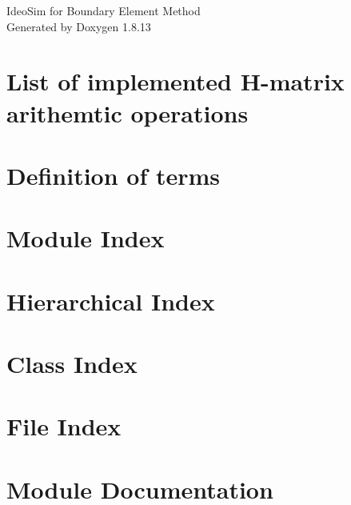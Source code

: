 \documentclass[twoside]{book}
\newcommand{\+}{\discretionary{\mbox{\scriptsize$\hookleftarrow$}}{}{}}
\newcommand{\clearemptydoublepage}{%
  \newpage{\pagestyle{empty}\cleardoublepage}%
}
\begin{document}
\hypersetup{pageanchor=false,
             bookmarksnumbered=true,
             pdfencoding=unicode
            }
\begin{titlepage}
\vspace*{7cm}
\begin{center}%
{\Large IdeoSim for Boundary Element Method}\\
\vspace*{1cm}
{\large Generated by Doxygen 1.8.13}\\
\end{center}
\end{titlepage}
\clearemptydoublepage
{}
\tableofcontents
\clearemptydoublepage
{}
\hypersetup{pageanchor=true}

\chapter{List of implemented H-\/matrix arithemtic operations}
\label{md_hackbusch-h-matrix-implementation}

\chapter{Definition of terms}
\label{md_term-definitions}

\chapter{Module Index}

\chapter{Hierarchical Index}

\chapter{Class Index}

\chapter{File Index}

\chapter{Module Documentation}






\end{document}
